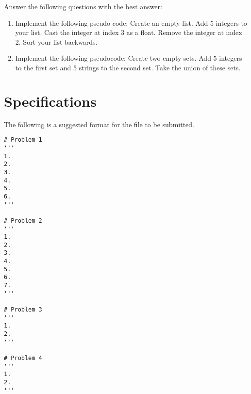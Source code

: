\begin{problem}
Answer the following questions with the best answer:

\begin{enumerate}
\item Implement the following pseudo code: Create an empty list. 
Add 5 integers to your list. 
Cast the integer at index 3 as a float.
Remove the integer at index 2. 
Sort your list backwards. 
\item Implement the following pseudocode: Create two empty sets.
Add 5 integers to the first set and 5 strings to the second set.
Take the union of these sets.

\end{enumerate}
\end{problem}

\section*{Specifications}
The following is a suggested format for the  file to be submitted.
\begin{lstlisting}
# Problem 1
'''
1. 
2. 
3. 
4. 
5. 
6. 
'''

# Problem 2	
'''
1. 
2.
3. 
4. 
5. 
6. 
7. 
'''

# Problem 3
'''	
1.
2.
'''

# Problem 4
'''
1. 
2. 
'''
\end{lstlisting}	
